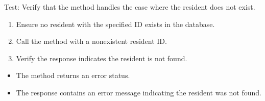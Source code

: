 \documentclass[letterpaper,10pt,english]{sphinxmanual}
\begin{document}
\begin{fulllineitems}
\label{\detokenize{test:test.test_residetnt.test_update_resident_room_resident_not_found}}
\pysigstartsignatures
\pysiglinewithargsret
{}
{}
{}
\pysigstopsignatures
\sphinxAtStartPar
Test: Verify that the method handles the case where the resident does not exist.
\begin{description}
\begin{enumerate}
%
\item {} 
\sphinxAtStartPar
Ensure no resident with the specified ID exists in the database.

\item {} 
\sphinxAtStartPar
Call the  method with a non\sphinxhyphen{}existent resident ID.

\item {} 
\sphinxAtStartPar
Verify the response indicates the resident is not found.

\end{enumerate}

\begin{itemize}
\item {} 
\sphinxAtStartPar
The method returns an error status.

\item {} 
\sphinxAtStartPar
The response contains an error message indicating the resident was not found.

\end{itemize}

\end{description}

\end{fulllineitems}

\end{document}

